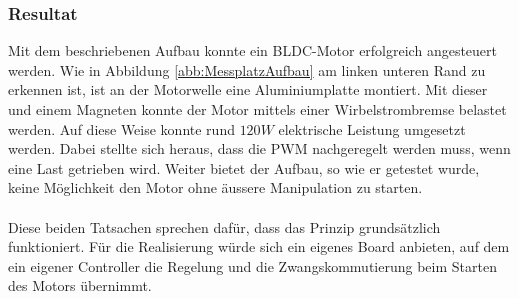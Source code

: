 \subsubsection{Resultat}
\label{chap:VersuchsResultat}
\fi
Mit dem beschriebenen Aufbau konnte ein BLDC-Motor erfolgreich angesteuert 
werden. Wie in Abbildung \ref{abb:MessplatzAufbau} am linken unteren Rand zu 
erkennen ist, ist an der Motorwelle eine Aluminiumplatte montiert. Mit dieser 
und einem Magneten konnte der Motor mittels einer Wirbelstrombremse belastet 
werden. Auf diese Weise konnte rund $120 W$ elektrische Leistung umgesetzt 
werden. Dabei stellte sich heraus, dass die PWM nachgeregelt werden muss, wenn 
eine Last getrieben wird. Weiter bietet der Aufbau, so wie er getestet wurde, 
keine Möglichkeit den Motor ohne äussere Manipulation zu starten.\\
\\
Diese beiden Tatsachen sprechen dafür, dass das Prinzip grundsätzlich 
funktioniert. Für die Realisierung würde sich ein eigenes Board anbieten, auf 
dem ein eigener Controller die Regelung und die Zwangskommutierung beim 
Starten des Motors übernimmt.
